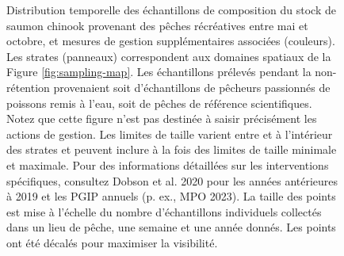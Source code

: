 \begin{figure}[htb]
    \centering
    \caption{Distribution temporelle des échantillons de composition du stock de saumon chinook provenant des pêches récréatives entre mai et octobre, et mesures de gestion supplémentaires associées (couleurs). Les strates (panneaux) correspondent aux domaines spatiaux de la Figure \ref{fig:sampling-map}. Les échantillons prélevés pendant la non-rétention provenaient soit d'échantillons de pêcheurs passionnés de poissons remis à l'eau, soit de pêches de référence scientifiques. Notez que cette figure n'est pas destinée à saisir précisément les actions de gestion. Les limites de taille varient entre et à l'intérieur des strates et peuvent inclure à la fois des limites de taille minimale et maximale. Pour des informations détaillées sur les interventions spécifiques, consultez Dobson et al. 2020 pour les années antérieures à 2019 et les PGIP annuels (p. ex., MPO 2023). La taille des points est mise à l'échelle du nombre d'échantillons individuels collectés dans un lieu de pêche, une semaine et une année donnés. Les points ont été décalés pour maximiser la visibilité.}
    \label{fig:temporal-fishery-samples-management}
\end{figure}

